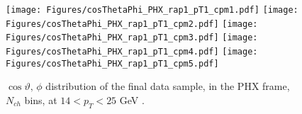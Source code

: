 \documentclass[12pt]{article}
\newcommand{\pt}{$p_{\mathrm{T}}$}
\begin{document}
%
%


\begin{figure}[htbp]
\centering
\texttt{[image: Figures/cosThetaPhi\_PHX\_rap1\_pT1\_cpm1.pdf]}
\texttt{[image: Figures/cosThetaPhi\_PHX\_rap1\_pT1\_cpm2.pdf]}
\texttt{[image: Figures/cosThetaPhi\_PHX\_rap1\_pT1\_cpm3.pdf]}
\texttt{[image: Figures/cosThetaPhi\_PHX\_rap1\_pT1\_cpm4.pdf]}
\texttt{[image: Figures/cosThetaPhi\_PHX\_rap1\_pT1\_cpm5.pdf]}
\caption{$\cos\vartheta,\,\phi$ distribution of the final data sample, 
	in the PHX frame, $N_{ch}$ bins, at $14 < p_{T} < 25$ GeV .}
\end{figure}
\clearpage
\end{document}
